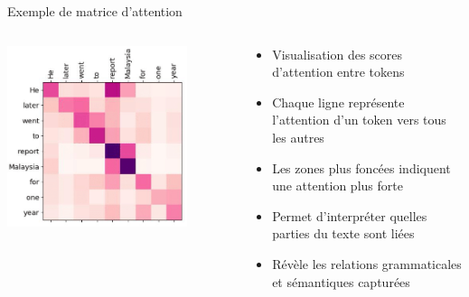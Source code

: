 \documentclass[aspectratio=169]{beamer}
\begin{document}
\begin{frame}{Exemple de matrice d'attention}
    \begin{columns}
        \begin{column}{0.6\textwidth}
            \begin{center}
                \includegraphics[width=0.8\textwidth]{images/attn_mat_example.png}
            \end{center}
        \end{column}
        \begin{column}{0.4\textwidth}
            \begin{itemize}
                \item Visualisation des scores d'attention entre tokens
                \item Chaque ligne représente l'attention d'un token vers tous les autres
                \item Les zones plus foncées indiquent une attention plus forte
                \item Permet d'interpréter quelles parties du texte sont liées
                \item Révèle les relations grammaticales et sémantiques capturées
            \end{itemize}
        \end{column}
    \end{columns}
\end{frame}
\end{document}
